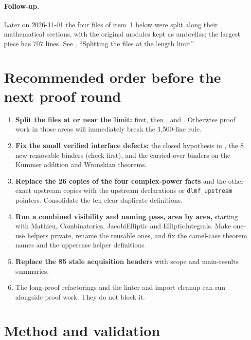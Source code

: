\documentclass[11pt,a4paper]{article}
\newcommand{\dlmf}{\repofile{lean-DLMF}}
\begin{document}
\paragraph{Follow-up.} Later on 2026-11-01 the four files of item~1 below were split along their
mathematical sections, with the original modules kept as umbrellas; the largest piece has 707
lines. See \dlmf{REVIEW.md}, ``Splitting the files at the length limit''.

\section{Recommended order before the next proof round}

\begin{enumerate}
  \item \textbf{Split the files at or near the limit:} 
    first, then ,  and
    . Otherwise proof work in those areas will
    immediately break the 1{,}500-line rule.
  \item \textbf{Fix the small verified interface defects:} the closed hypothesis in
    , the 8 new removable binders (check
     first), and the carried-over binders on the Kummer addition and
    Wronskian theorems.
  \item \textbf{Replace the 26 copies of the four complex-power facts} and the other exact
    upstream copies with the upstream declarations or \texttt{dlmf\_upstream} pointers.
    Consolidate the ten clear duplicate definitions.
  \item \textbf{Run a combined visibility and naming pass, area by area,} starting with
    Mathieu, Combinatorics, JacobiElliptic and EllipticIntegrals. Make one-use helpers
    private, rename the reusable ones, and fix the camel-case theorem names and the
    uppercase helper definitions.
  \item \textbf{Replace the 85 stale acquisition headers} with scope and main-results summaries.
  \item The long-proof refactorings and the linter and import cleanup can run alongside proof
    work. They do not block it.
\end{enumerate}

\section*{Method and validation}
\end{document}
